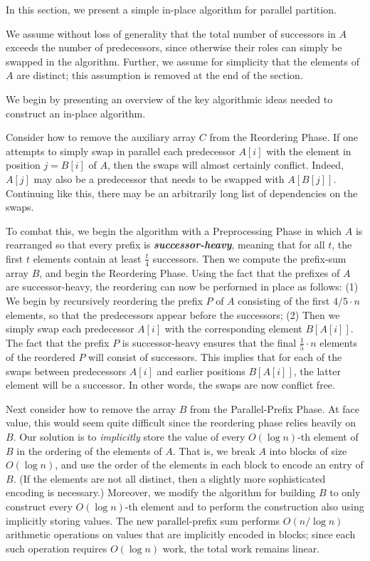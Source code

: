 \documentclass[sigconf]{acmart}
\newcommand{\defn}[1]       {{\textit{\textbf{\boldmath #1}}}}
\renewcommand{\paragraph}[1]{\vspace{0.09in}\noindent{\bf \boldmath #1.}}
\theoremstyle{remark}
\theoremstyle{remark}
\begin{document}
In this section, we present a simple in-place algorithm for parallel
partition. 

We assume without loss of generality that the total number of
successors in $A$ exceeds the number of predecessors, since otherwise
their roles can simply be swapped in the algorithm. Further, we assume
for simplicity that the elements of $A$ are distinct; this assumption
is removed at the end of the section.


\paragraph{Algorithm Outline}
We begin by presenting an overview of the key algorithmic ideas needed
to construct an in-place algorithm.

Consider how to remove the auxiliary array $C$ from the Reordering
Phase. If one attempts to simply swap in parallel each predecessor
$A[i]$ with the element in position $j = B[i]$ of $A$, then the swaps
will almost certainly conflict. Indeed, $A[j]$ may also be a
predecessor that needs to be swapped with $A[B[j]]$. Continuing like
this, there may be an arbitrarily long list of dependencies on the
swaps.

To combat this, we begin the algorithm with a Preprocessing Phase in
which $A$ is rearranged so that every prefix is
\defn{successor-heavy}, meaning that for all $t$, the first $t$ elements contain at
least $\frac{t}{4}$ successors. Then we compute the
prefix-sum array $B$, and begin the Reordering Phase. Using the
fact that the prefixes of $A$ are successor-heavy, the reordering can
now be performed in place as follows: (1) We begin by recursively
reordering the prefix $P$ of $A$ consisting of the first $4/5 \cdot n$
elements, so that the predecessors appear before the successors; (2)
Then we simply swap each predecessor $A[i]$ with the corresponding
element $B[A[i]]$. The fact that the prefix $P$ is successor-heavy
ensures that the final $\frac{1}{5} \cdot n$ elements of the reordered
$P$ will consist of successors. This implies that for each of the
swaps between predecessors $A[i]$ and earlier positions $B[A[i]]$, the
latter element will be a successor. In other words, the swaps are now
conflict free.

Next consider how to remove the array $B$ from the Parallel-Prefix
Phase. At face value, this would seem quite difficult since the
reordering phase relies heavily on $B$. Our solution is to
\emph{implicitly} store the value of every $O(\log n)$-th element of
$B$ in the ordering of the elements of $A$. That is, we break $A$ into
blocks of size $O(\log n)$, and use the order of the elements in each
block to encode an entry of $B$. (If the elements are not all
  distinct, then a slightly more sophisticated encoding is necessary.)
Moreover, we modify the algorithm for building $B$ to only construct
every $O(\log n)$-th element and to perform the construction also
using implicitly storing values. The new parallel-prefix sum performs
$O(n / \log n)$ arithmetic operations on values that are implicitly
encoded in blocks; since each such operation requires $O(\log n)$
work, the total work remains linear.
\end{document}
